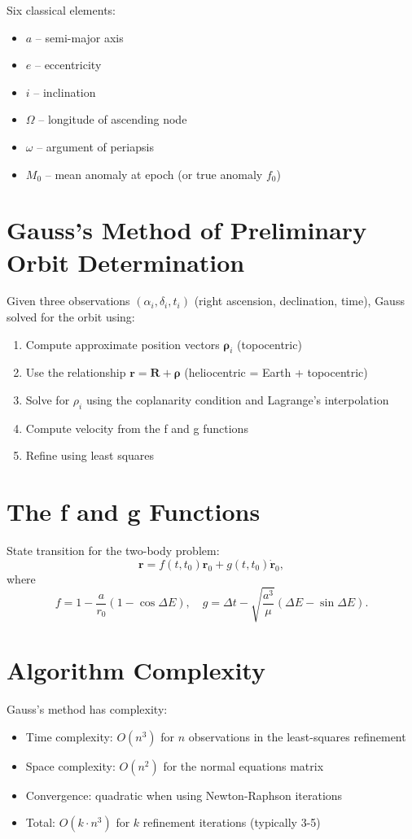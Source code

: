 Six classical elements:
\begin{itemize}
    \item $a$ -- semi-major axis
    \item $e$ -- eccentricity
    \item $i$ -- inclination
    \item $\Omega$ -- longitude of ascending node
    \item $\omega$ -- argument of periapsis
    \item $M_0$ -- mean anomaly at epoch (or true anomaly $f_0$)
\end{itemize}

\section{Gauss's Method of Preliminary Orbit Determination}

Given three observations $(\alpha_i, \delta_i, t_i)$ (right ascension, declination, time), Gauss solved for the orbit using:

\begin{enumerate}
    \item Compute approximate position vectors $\mathbf{\rho}_i$ (topocentric)
    \item Use the relationship $\mathbf{r} = \mathbf{R} + \mathbf{\rho}$ (heliocentric = Earth + topocentric)
    \item Solve for $\rho_i$ using the coplanarity condition and Lagrange's interpolation
    \item Compute velocity from the f and g functions
    \item Refine using least squares
\end{enumerate}

\section{The f and g Functions}

State transition for the two-body problem:
\[
\mathbf{r} = f(t, t_0) \mathbf{r}_0 + g(t, t_0) \dot{\mathbf{r}}_0,
\]
where
\[
f = 1 - \frac{a}{r_0}(1 - \cos \Delta E), \quad
g = \Delta t - \sqrt{\frac{a^3}{\mu}} (\Delta E - \sin \Delta E).
\]

\section{Algorithm Complexity}

Gauss's method has complexity:
\begin{itemize}
    \item Time complexity: $O(n^3)$ for $n$ observations in the least-squares refinement
    \item Space complexity: $O(n^2)$ for the normal equations matrix
    \item Convergence: quadratic when using Newton-Raphson iterations
    \item Total: $O(k \cdot n^3)$ for $k$ refinement iterations (typically 3-5)
\end{itemize}

